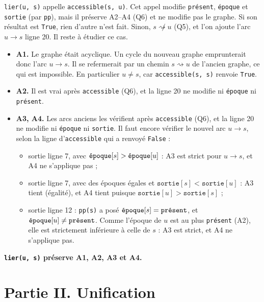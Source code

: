 \documentclass[11pt,a4paper]{article}
\providecommand{\tightlist}{\setlength{\itemsep}{0pt}\setlength{\parskip}{0pt}}
\begin{document}
\texttt{lier(u,\ s)} appelle \texttt{accessible(s,\ u)}. Cet appel modifie \texttt{présent}, \texttt{époque} et \texttt{sortie} (par \texttt{pp}), mais il préserve A2--A4 (Q6) et ne modifie pas le graphe. Si son résultat est \texttt{True}, rien d'autre n'est fait. Sinon, \(s\not\rightsquigarrow u\) (Q5), et l'on ajoute l'arc \(u\to s\) ligne 20. Il reste à étudier ce cas.

\begin{itemize}
\tightlist
\item
  \textbf{A1.} Le graphe était acyclique. Un cycle du nouveau graphe emprunterait donc l'arc \(u\to s\). Il se refermerait par un chemin \(s\rightsquigarrow u\) de l'ancien graphe, ce qui est impossible. En particulier \(u\neq s\), car \texttt{accessible(s,\ s)} renvoie \texttt{True}.
\item
  \textbf{A2.} Il est vrai après \texttt{accessible} (Q6), et la ligne 20 ne modifie ni \texttt{époque} ni \texttt{présent}.
\item
  \textbf{A3, A4.} Les arcs anciens les vérifient après \texttt{accessible} (Q6), et la ligne 20 ne modifie ni \texttt{époque} ni \texttt{sortie}. Il faut encore vérifier le nouvel arc \(u\to s\), selon la ligne d'\texttt{accessible} qui a renvoyé \texttt{False} :

  \begin{itemize}
  \tightlist
  \item
    sortie ligne 7, avec \(\texttt{\text{époque}}[s]>\texttt{\text{époque}}[u]\) : A3 est strict pour \(u\to s\), et A4 ne s'applique pas ;
  \item
    sortie ligne 7, avec des époques égales et \(\texttt{sortie}[s]<\texttt{sortie}[u]\) : A3 tient (égalité), et A4 tient puisque \(\texttt{sortie}[u]>\texttt{sortie}[s]\) ;
  \item
    sortie ligne 12 : \texttt{pp(s)} a posé \(\texttt{\text{époque}}[s]=\texttt{\text{présent}}\), et \(\texttt{\text{époque}}[u]\neq\texttt{\text{présent}}\). Comme l'époque de \(u\) est au plus \texttt{présent} (A2), elle est strictement inférieure à celle de \(s\) : A3 est strict, et A4 ne s'applique pas.
  \end{itemize}
\end{itemize}

\textbf{\texttt{lier(u,\ s)} préserve A1, A2, A3 et A4.}

\hypertarget{partie-ii.-unification}{%
\section{Partie II. Unification}\label{partie-ii.-unification}}
\end{document}
